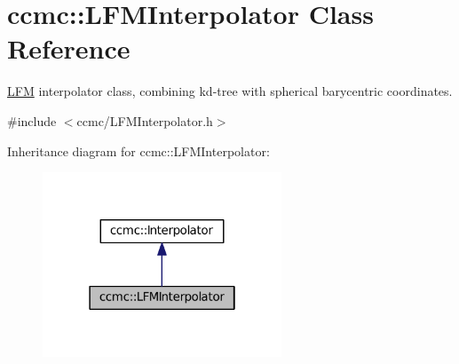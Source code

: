 \hypertarget{classccmc_1_1_l_f_m_interpolator}{\section{ccmc\-:\-:L\-F\-M\-Interpolator Class Reference}
\label{classccmc_1_1_l_f_m_interpolator}
}


\hyperlink{classccmc_1_1_l_f_m}{L\-F\-M} interpolator class, combining kd-\/tree with spherical barycentric coordinates.  




{\ttfamily \#include $<$ccmc/\-L\-F\-M\-Interpolator.\-h$>$}



Inheritance diagram for ccmc\-:\-:L\-F\-M\-Interpolator\-:\nopagebreak
\begin{figure}[H]
\begin{center}
\leavevmode
\includegraphics[width=202pt]{classccmc_1_1_l_f_m_interpolator__inherit__graph}
\end{center}
\end{figure}


